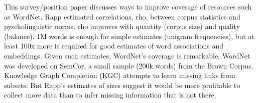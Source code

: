 This survey/position paper discusses ways to improve coverage of resources such as WordNet. Rapp estimated correlations, rho, between corpus statistics and pyscholinguistic norms.  rho improves with quantity (corpus size) and quality (balance). 1M words is enough for simple estimates (unigram frequencies), but at least 100x more is required for good estimates of word associations and embeddings. Given such estimates, WordNet's coverage is remarkable.  WordNet was developed on SemCor, a small  sample (200k words) from the Brown Corpus.  Knowledge Graph Completion (KGC) attempts to learn missing links from subsets.  But Rapp's estimates of sizes suggest it would be more profitable to collect more data than to infer missing information that is not there.
